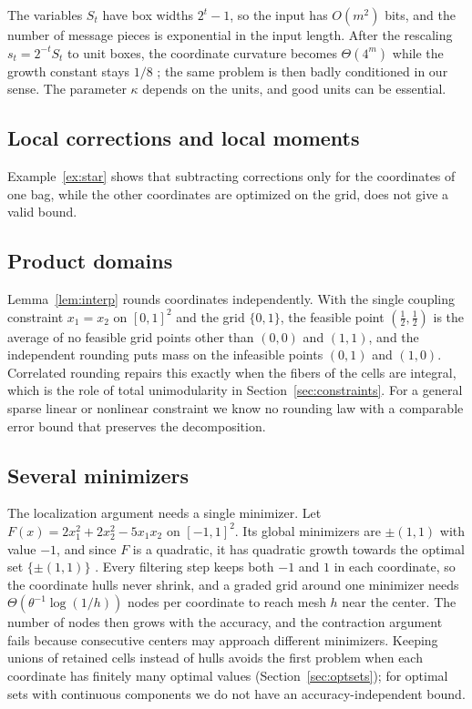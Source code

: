The variables $S_t$ have box widths $2^t-1$, so the input has $O(m^2)$ bits,
and the number of message pieces is exponential in the input length. After
the rescaling $s_t=2^{-t}S_t$ to unit boxes, the coordinate curvature becomes
$\Theta(4^m)$ while the growth constant stays $1/8$ ; the same
problem is then badly conditioned in our sense. The parameter $\kappa$
depends on the units, and good units can be essential.

\subsection{Local corrections and local moments}
Example~\ref{ex:star} shows that subtracting corrections only for the
coordinates of one bag, while the other coordinates are optimized on the
grid, does not give a valid bound. 

\subsection{Product domains}
Lemma~\ref{lem:interp} rounds coordinates independently. With the single
coupling constraint $x_1=x_2$ on $[0,1]^2$ and the grid $\{0,1\}$, the
feasible point $(\frac12,\frac12)$ is the average of no feasible grid
points other than $(0,0)$ and $(1,1)$, and the independent rounding puts
mass on the infeasible points $(0,1)$ and $(1,0)$. Correlated rounding
repairs this exactly when the fibers of the cells are integral, which is
the role of total unimodularity in Section~\ref{sec:constraints}. For a
general sparse linear or nonlinear constraint we know no rounding law with
a comparable error bound that preserves the decomposition.

\subsection{Several minimizers}
The localization argument needs a single minimizer. Let
$F(x)=2x_1^2+2x_2^2-5x_1x_2$ on $[-1,1]^2$. Its global minimizers are
$\pm(1,1)$ with value $-1$, and since $F$ is a quadratic, it has quadratic
growth towards the optimal set $\{\pm(1,1)\}$ \cite{LuoSturm2000}. Every
filtering step keeps both $-1$ and $1$ in each coordinate, so the coordinate
hulls never shrink, and a graded grid around one minimizer needs
$\Theta(\theta^{-1}\log(1/h))$ nodes per coordinate to reach mesh $h$ near the
center. The number of nodes then grows with the accuracy, and the
contraction argument fails because consecutive centers may approach
different minimizers. Keeping unions of retained cells instead of hulls
avoids the first problem when each coordinate has finitely many optimal
values (Section~\ref{sec:optsets}); for optimal sets with continuous
components we do not have an accuracy-independent bound.
